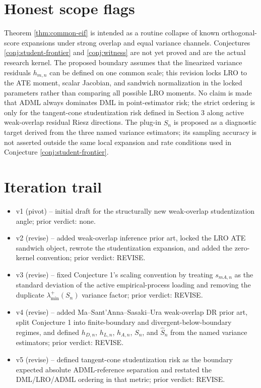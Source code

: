 \documentclass[11pt]{article}
\theoremstyle{definition}
\theoremstyle{plain}
\theoremstyle{remark}
\begin{document}
\section{Honest scope flags}
Theorem \ref{thm:common-eif} is intended as a routine collapse of known
orthogonal-score expansions under strong overlap and equal variance channels.
Conjectures \ref{conj:student-frontier} and \ref{conj:witness} are not yet
proved and are the actual research kernel.  The proposed boundary assumes that
the linearized variance residuals \(h_{m,n}\) can be defined on one common
scale; this revision locks LRO to the ATE moment, scalar Jacobian, and
sandwich normalization in the locked parameters rather than comparing all
possible LRO moments.  No claim is made that ADML always
dominates DML in point-estimator risk; the strict ordering is only for
the tangent-cone studentization risk defined in Section 3 along active
weak-overlap residual Riesz directions.
The plug-in \(\widehat S_n\) is proposed as a diagnostic target derived from
the three named variance estimators; its sampling accuracy is not asserted
outside the same local expansion and rate conditions used in Conjecture
\ref{conj:student-frontier}.

\section{Iteration trail}
\begin{itemize}[leftmargin=*]
\item v1 (pivot) -- initial draft for the structurally new weak-overlap
studentization angle; prior verdict: none.
\item v2 (revise) -- added weak-overlap inference prior art, locked the LRO
ATE sandwich object, rewrote the studentization expansion, and added the
zero-kernel convention; prior verdict: REVISE.
\item v3 (revise) -- fixed Conjecture 1's scaling convention by treating
\(s_{mA,n}\) as the standard deviation of the active empirical-process
loading and removing the duplicate \(\lambda_{\min}^+(S_n)\) variance factor;
prior verdict: REVISE.
\item v4 (revise) -- added Ma--Sant'Anna--Sasaki--Ura weak-overlap DR prior
art, split Conjecture 1 into finite-boundary and divergent-below-boundary
regimes, and defined \(h_{D,n}\), \(h_{L,n}\), \(h_{A,n}\), \(S_n\), and
\(\widehat S_n\) from the named variance estimators; prior verdict: REVISE.
\item v5 (revise) -- defined tangent-cone studentization risk as the
boundary expected absolute ADML-reference separation and restated the
DML/LRO/ADML ordering in that metric; prior verdict: REVISE.
\end{itemize}
\end{document}
